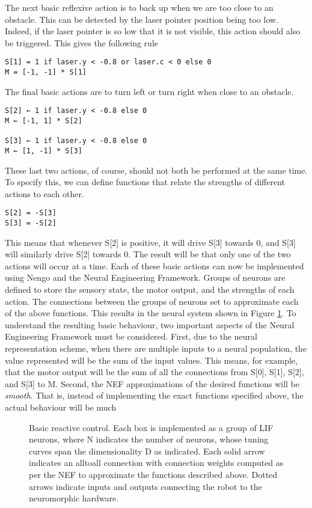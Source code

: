 \documentclass[conference]{IEEEtran}
\begin{document}
The next basic reflexive action is to back up when we are
too close to an obstacle. This can be detected by the laser
pointer position being too low. Indeed, if the laser pointer is
so low that it is not visible, this action should also be
triggered. This gives the following rule

\begin{lstlisting}
S[1] = 1 if laser.y < -0.8 or laser.c < 0 else 0
M = [-1, -1] * S[1]
\end{lstlisting}

The final basic actions are to turn left or turn right when
close to an obstacle. 

\begin{lstlisting}
S[2] ← 1 if laser.y < -0.8 else 0
M ← [-1, 1] * S[2]

S[3] ← 1 if laser.y < -0.8 else 0
M ← [1, -1] * S[3]
\end{lstlisting}

These last two actions, of course, should not both be
performed at the same time. To specify this, we can define
functions that relate the strengths of different actions to
each other.

\begin{lstlisting}
S[2] = -S[3]
S[3] = -S[2]
\end{lstlisting}

This means that whenever S[2] is positive, it will drive
S[3] towards 0, and S[3] will similarly drive S[2] towards 0.
The result will be that only one of the two actions will occur
at a time.
Each of these basic actions can now be implemented
using Nengo and the Neural Engineering Framework.
Groups of neurons are defined to store the sensory state, the
motor output, and the strengths of each action. The
connections between the groups of neurons set to
approximate each of the above functions. This results in the
neural system shown in Figure \ref{React}.
To understand the resulting basic behaviour, two important
aspects of the Neural Engineering Framework must be
considered. First, due to the neural representation scheme,
when there are multiple inputs to a neural population, the
value represented will be the sum of the input values. This
means, for example, that the motor output will be the sum
of all the connections from S[0], S[1], S[2], and S[3] to M.
Second, the NEF approximations of the desired functions
will be \textit{smooth}. That is, instead of implementing the exact
functions specified above, the actual behaviour will be much

\begin{figure}[!t]
\label{React}
\centering
\caption{Basic reactive control. Each box is implemented as a group of LIF neurons, where N indicates the number of neurons, whose tuning curves span the dimensionality D as indicated. Each solid arrow indicates an alltoall connection with connection weights computed as per the NEF to approximate the functions described above. Dotted arrows indicate inputs
and outputs connecting the robot to the neuromorphic hardware.}
\end{figure}
\end{document}
